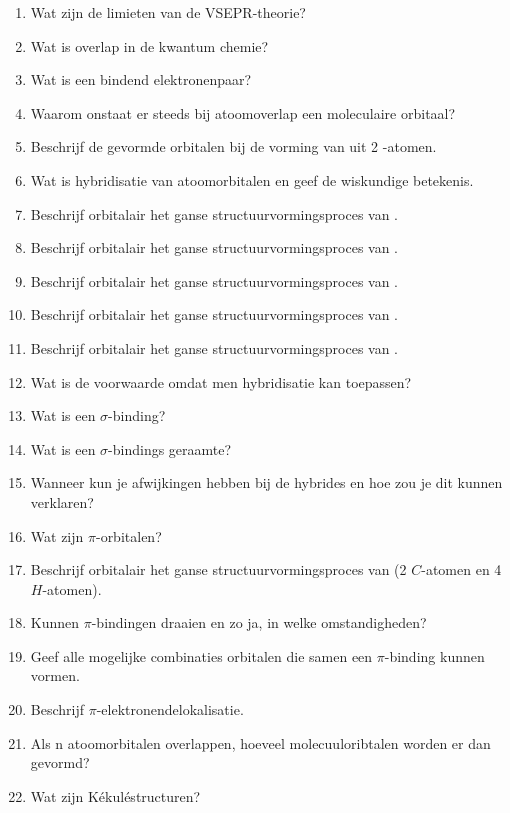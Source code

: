 \documentclass[a4paper,12pt]{article}
\begin{document}
    \begin{enumerate}
        \item Wat zijn de limieten van de VSEPR-theorie?
        \item Wat is overlap in de kwantum chemie?
        \item Wat is een bindend elektronenpaar?
        \item Waarom onstaat er steeds bij atoomoverlap een moleculaire orbitaal?
        \item Beschrijf de gevormde orbitalen bij de vorming van  uit 2 -atomen.
        \item Wat is hybridisatie van atoomorbitalen en geef de wiskundige betekenis.
	\item Beschrijf orbitalair het ganse structuurvormingsproces van .
	\item Beschrijf orbitalair het ganse structuurvormingsproces van .
	\item Beschrijf orbitalair het ganse structuurvormingsproces van .
	\item Beschrijf orbitalair het ganse structuurvormingsproces van . 
	\item Beschrijf orbitalair het ganse structuurvormingsproces van .
	\item Wat is de voorwaarde omdat men hybridisatie kan toepassen?
	\item Wat is een $\sigma$-binding?
	\item Wat is een $\sigma$-bindings geraamte?
	\item Wanneer kun je afwijkingen hebben bij de hybrides en hoe zou je dit kunnen verklaren?
	\item Wat zijn $\pi$-orbitalen?
	\item Beschrijf orbitalair het ganse structuurvormingsproces van  (2 $C$-atomen en 4 $H$-atomen).
	\item Kunnen $\pi$-bindingen draaien en zo ja, in welke omstandigheden?
	\item Geef alle mogelijke combinaties orbitalen die samen een  $\pi$-binding kunnen vormen.
	\item Beschrijf  $\pi$-elektronendelokalisatie.
	\item Als n atoomorbitalen overlappen, hoeveel molecuuloribtalen worden er dan gevormd?
	\item Wat zijn K\'ekul\'estructuren?

    \end{enumerate}
\end{document}

